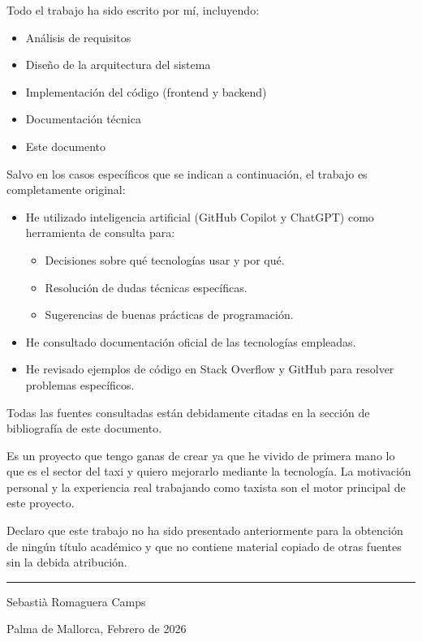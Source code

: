 \documentclass[12pt,a4paper]{article}
\begin{document}
Todo el trabajo ha sido escrito por mí, incluyendo:
\begin{itemize}
    \item Análisis de requisitos
    \item Diseño de la arquitectura del sistema
    \item Implementación del código (frontend y backend)
    \item Documentación técnica
    \item Este documento
\end{itemize}

Salvo en los casos específicos que se indican a continuación, el trabajo es completamente original:

\begin{itemize}
    \item He utilizado inteligencia artificial (GitHub Copilot y ChatGPT) como herramienta de consulta para:
    \begin{itemize}
        \item Decisiones sobre qué tecnologías usar y por qué.
        \item Resolución de dudas técnicas específicas.
        \item Sugerencias de buenas prácticas de programación.
    \end{itemize}
    \item He consultado documentación oficial de las tecnologías empleadas.
    \item He revisado ejemplos de código en Stack Overflow y GitHub para resolver problemas específicos.
\end{itemize}

Todas las fuentes consultadas están debidamente citadas en la sección de bibliografía de este documento.

\vspace{1cm}

Es un proyecto que tengo ganas de crear ya que he vivido de primera mano lo que es el sector del taxi y quiero mejorarlo mediante la tecnología. La motivación personal y la experiencia real trabajando como taxista son el motor principal de este proyecto.

\vspace{2cm}

Declaro que este trabajo no ha sido presentado anteriormente para la obtención de ningún título académico y que no contiene material copiado de otras fuentes sin la debida atribución.

\vspace{3cm}

\noindent
\rule{7cm}{0.4pt}

\noindent
Sebastià Romaguera Camps

\noindent
Palma de Mallorca, Febrero de 2026
\end{document}
